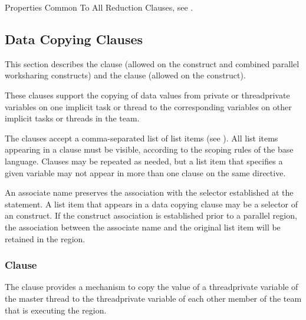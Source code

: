 \begin{crossrefs}
\item Properties Common To All Reduction Clauses, see
.
\end{crossrefs}



\subsection{Data Copying Clauses}
\label{subsec:Data Copying Clauses}
This section describes the  clause (allowed on the  
construct and combined parallel worksharing constructs) and the  
clause (allowed on the  construct).

These clauses support the copying of data values from private or threadprivate 
variables on one implicit task or thread to the corresponding variables on other 
implicit tasks or threads in the team.

The clauses accept a comma-separated list of list items (see 
). All list items appearing in a clause must be 
visible, according to the scoping rules of the base language. Clauses may be 
repeated as needed, but a list item that specifies a given variable may not 
appear in more than one clause on the same directive.

\begin{fortranspecific}
An associate name preserves the association with the selector established at 
the  statement. A list item that appears in a data copying 
clause may be a selector of an  construct. If the construct 
association is established prior to a parallel region, the association between 
the associate name and the original list item will be retained in the region.
\end{fortranspecific}



\subsubsection{ Clause}
\label{subsubsec:copyin clause}
\summary
The  clause provides a mechanism to copy the value of a threadprivate 
variable of the master thread to the threadprivate variable of each other member of 
the team that is executing the  region.

